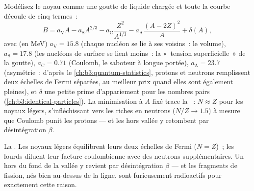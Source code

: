\begin{proposition}\label{prop:b3:nuclear-physics:semf}
Modélisez le noyau comme une goutte de liquide chargée et toute la
courbe découle de cinq termes~:
\[
B = a_{\text{V}}A - a_{\text{S}}A^{2/3}
- a_{\text{C}}\frac{Z^2}{A^{1/3}}
- a_{\text{A}}\frac{(A - 2Z)^2}{A} + \delta(A) ,
\]
avec (en \unit{MeV}) $a_{\text{V}} = 15.8$ (chaque nucléon se lie à
ses voisins~: le volume), $a_{\text{S}} = 17.8$ (les nucléons de
surface se lient moins~: la «~tension superficielle~» de la goutte),
$a_{\text{C}} = 0.71$ (Coulomb, le saboteur à longue portée),
$a_{\text{A}} = 23.7$ (asymétrie~: d'après le
\cref{ch:b3:quantum-statistics}, protons et neutrons remplissent deux
échelles de Fermi séparées, au meilleur prix quand elles sont
également pleines), et $\delta$ une petite prime d'appariement pour
les nombres pairs (\cref{ch:b3:identical-particles}). La
minimisation à $A$ fixé trace la \emph{}~:
$N \approx Z$ pour les noyaux légers, s'infléchissant vers les riches
en neutrons ($N/Z \to 1.5$) à mesure que Coulomb punit les protons
--- et les  hors vallée y retombent par désintégration
$\beta$.
\end{proposition}
\admitted

\begin{omfigure}

{\small La . Les noyaux légers équilibrent leurs
deux échelles de Fermi ($N = Z$)~; les lourds diluent leur facture
coulombienne avec des neutrons supplémentaires. Un  hors du
fond de la vallée y revient par désintégration $\beta$ --- et les
fragments de fission, nés bien au-dessus de la ligne, sont
furieusement radioactifs pour exactement cette raison.}
\end{omfigure}

